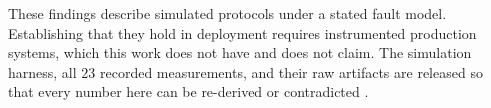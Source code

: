 \documentclass[10pt,twocolumn,letterpaper]{article}
\begin{document}
These findings describe simulated protocols under a stated fault model. Establishing that they hold in deployment requires instrumented production systems, which this work does not have and does not claim. The simulation harness, all $23$ recorded measurements, and their raw artifacts are released so that every number here can be re-derived or contradicted \cite{arxiv_2406_00584,crossref_10_1201_9788743808145_14,crossref_10_1108_jeim_12_2025_1269}.


\par\vspace{0.5em}



\end{document}
